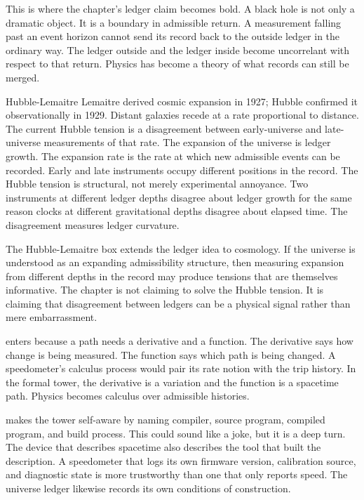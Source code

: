 This is where the chapter's ledger claim becomes bold. A black hole is not
only a dramatic object. It is a boundary in admissible return. A measurement
falling past an event horizon cannot send its record back to the outside ledger
in the ordinary way. The ledger outside and the ledger inside become
uncorrelant with respect to that return. Physics has become a theory of what
records can still be merged.

\begin{gphenom}{Hubble-Lemaitre}
\label{ph:hubble-lemaitre}
\GPhObs Lemaitre derived cosmic expansion in 1927; Hubble confirmed it
observationally in 1929. Distant galaxies recede at a rate proportional to
distance. The current Hubble tension is a disagreement between early-universe
and late-universe measurements of that rate.
\GPhCon The expansion of the universe is ledger growth. The expansion rate is
the rate at which new admissible events can be recorded. Early and late
instruments occupy different positions in the record.
\GPhSeq The Hubble tension is structural, not merely experimental annoyance.
Two instruments at different ledger depths disagree about ledger growth for the
same reason clocks at different gravitational depths disagree about elapsed
time. The disagreement measures ledger curvature.
\end{gphenom}

The Hubble-Lemaitre box extends the ledger idea to cosmology. If the universe
is understood as an expanding admissibility structure, then measuring expansion
from different depths in the record may produce tensions that are themselves
informative. The chapter is not claiming to solve the Hubble tension. It is
claiming that disagreement between ledgers can be a physical signal rather than
mere embarrassment.

 enters because a path needs a derivative and a function.
The derivative says how change is being measured. The function says which path
is being changed. A speedometer's calculus process would pair its rate notion
with the trip history. In the formal tower, the derivative is a variation and
the function is a spacetime path. Physics becomes calculus over admissible
histories.

 makes the tower self-aware by naming compiler, source program,
compiled program, and build process. This could sound like a joke, but it is a
deep turn. The device that describes spacetime also describes the tool that
built the description. A speedometer that logs its own firmware version,
calibration source, and diagnostic state is more trustworthy than one that only
reports speed. The universe ledger likewise records its own conditions of
construction.

